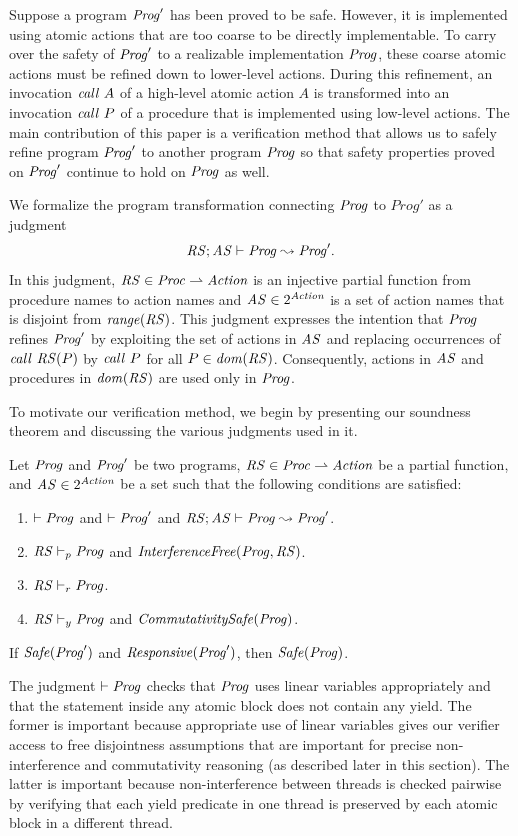 Suppose a program $\mathit{Prog}'$ has been proved to be safe.
However, it is implemented using atomic actions that are too coarse to be directly implementable.  
To carry over the safety of $\mathit{Prog}'$ to a realizable implementation $\mathit{Prog}$, 
these coarse atomic actions must be refined down to lower-level actions.
During this refinement, an invocation $\mathit{call}\ A$ of a high-level atomic action $A$ is transformed into an 
invocation $\mathit{call}\ P$ of a procedure that is implemented using low-level actions.
The main contribution of this paper is a verification method that allows us to safely refine
program $\mathit{Prog}'$ to another program $\mathit{Prog}$ so that 
safety properties proved on $\mathit{Prog}'$ continue to hold on $\mathit{Prog}$ as well.

We formalize the program transformation connecting $\mathit{Prog}$ to $Prog'$ as a judgment
\[
\mathit{RS};\mathit{AS} \vdash \mathit{Prog} \leadsto \mathit{Prog}'.
\]
In this judgment,
$\mathit{RS} \in \mathit{Proc} \rightharpoonup \mathit{Action}$ is an injective partial function from procedure names to action names
and $\mathit{AS} \in 2^{\mathit{Action}}$ is a set of action names that is disjoint from $\mathit{range}(\mathit{RS})$.
This judgment expresses the intention that $\mathit{Prog}$ refines $\mathit{Prog}'$
by exploiting the set of actions in $\mathit{AS}$ and replacing 
occurrences of $\mathit{call}\ \mathit{RS}(P)$ by $\mathit{call}\ P$ for all $P \in \mathit{dom}(\mathit{RS})$.
Consequently, actions in $\mathit{AS}$ and procedures in $\mathit{dom}(\mathit{RS})$ are used only in $\mathit{Prog}$.

To motivate our verification method, we begin by presenting our soundness theorem and discussing the various 
judgments used in it.
\begin{theorem}
Let $\mathit{Prog}$ and $\mathit{Prog}'$ be two programs, $\mathit{RS} \in \mathit{Proc} \rightharpoonup \mathit{Action}$ be a partial function,
and $\mathit{AS} \in 2^{\mathit{Action}}$ be a set such that the following conditions are satisfied:
\begin{enumerate}
\item
$\vdash \mathit{Prog}$ and $\vdash \mathit{Prog}'$ and $\mathit{RS};\mathit{AS} \vdash \mathit{Prog} \leadsto \mathit{Prog}'$.
\item
$\mathit{RS} \vdash_p \mathit{Prog}$ and $\mathit{InterferenceFree}(\mathit{Prog},\mathit{RS})$.
\item
$\mathit{RS} \vdash_r \mathit{Prog}$.
\item
$\mathit{RS} \vdash_y \mathit{Prog}$ and $\mathit{CommutativitySafe}(\mathit{Prog})$.
\end{enumerate}
If $\mathit{Safe}(\mathit{Prog}')$ and $\mathit{Responsive}(\mathit{Prog}')$, then $\mathit{Safe}(\mathit{Prog})$.
\end{theorem}

The judgment $\vdash \mathit{Prog}$ checks that $\mathit{Prog}$ uses linear variables appropriately and that the statement
inside any atomic block does not contain any yield.
The former is important because appropriate use of linear variables gives our verifier access to free disjointness
assumptions that are important for precise non-interference and commutativity reasoning (as described later in this section).
The latter is important because non-interference between threads is checked pairwise by verifying that each yield predicate
in one thread is preserved by each atomic block in a different thread.

